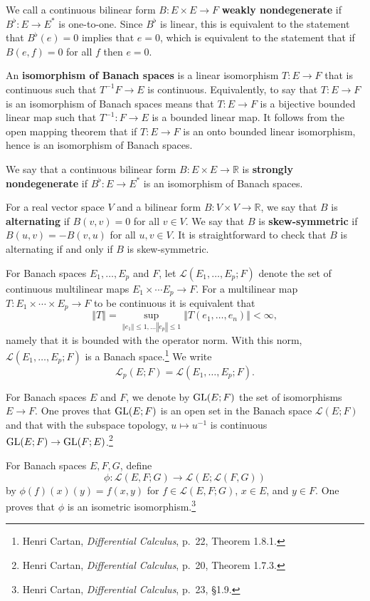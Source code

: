 \documentclass{article}
\newcommand{\GL}{\ensuremath\mathrm{GL}}
\newcommand{\norm}[1]{\left\Vert #1 \right\Vert}
\theoremstyle{definition}
\begin{document}
We call a continuous bilinear form $B:E \times E \to F$ \textbf{weakly nondegenerate} if $B^\flat:E \to E^*$
is one-to-one. Since $B^\flat$ is linear, this is equivalent to the statement that
$B^\flat(e)=0$ implies that $e=0$, which is equivalent to the statement that
 if $B(e,f)=0$ for all $f$ then $e=0$.
 
An \textbf{isomorphism of Banach spaces} is a linear isomorphism $T:E \to F$ that is continuous such that
$T^{-1}F \to E$ is continuous. Equivalently, to say that $T:E \to F$ is an isomorphism of Banach spaces
means that $T:E \to F$ is a bijective bounded linear map such that $T^{-1}:F \to E$ is a bounded linear map.
It follows from the open mapping theorem that if $T:E \to F$ is an onto bounded linear isomorphism, hence is an isomorphism of Banach spaces.

 We say that a continuous bilinear form $B:E \times E \to \mathbb{R}$ is \textbf{strongly nondegenerate} if $B^\flat:E \to E^*$ is an isomorphism of Banach spaces. 

For a real vector space $V$ and a bilinear form $B:V \times V \to \mathbb{R}$, we say that
$B$ is \textbf{alternating} if $B(v,v)=0$ for all $v \in V$. We say that $B$ is \textbf{skew-symmetric} if 
$B(u,v)=-B(v,u)$ for all $u,v \in V$. It is straightforward to check that $B$ is alternating if and only if $B$ is skew-symmetric.


For Banach spaces $E_1,\ldots,E_p$ and $F$, let
$\mathscr{L}(E_1,\ldots,E_p;F)$ denote the set of continuous multilinear maps
$E_1 \times \cdots E_p \to F$. For a multilinear map $T:E_1 \times \cdots \times E_p \to F$ to be continuous it is equivalent that
\[
\norm{T} = \sup_{\norm{e_1} \leq 1, \ldots \norm{e_p} \leq 1} \norm{T(e_1,\ldots,e_n)}
< \infty,
\]
namely that it is bounded with the operator norm. 
With this norm, $\mathscr{L}(E_1,\ldots,E_p;F)$ is a Banach space.\footnote{Henri Cartan, {\em Differential Calculus}, p.~22, Theorem 1.8.1.} 
We write
\[
\mathscr{L}_p(E;F) = \mathscr{L}(E_1,\ldots,E_p;F).
\]


For Banach spaces $E$ and $F$,
we denote by $\GL(E;F)$ the set of isomorphisms $E \to F$. One proves that $\GL(E;F)$ is an open set in the Banach space
$\mathscr{L}(E;F)$ and that with the subspace topology, $u \mapsto u^{-1}$ is continuous $\GL(E;F) \to \GL(F;E)$.\footnote{Henri Cartan, {\em Differential Calculus}, p.~20, Theorem 1.7.3.}


For Banach spaces $E,F,G$, define
\[
\phi:\mathscr{L}(E,F;G) \to \mathscr{L}(E;\mathscr{L}(F,G))
\]
by $\phi(f)(x)(y) = f(x,y)$ for $f \in \mathscr{L}(E,F;G)$, $x \in E$, and $y \in F$. One proves that
$\phi$ is an isometric isomorphism.\footnote{Henri Cartan, {\em Differential Calculus}, p.~23, \S 1.9.}
\end{document}
